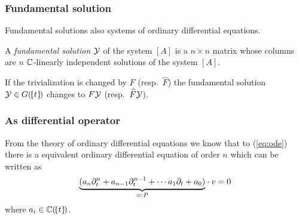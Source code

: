 \subsubsection{Fundamental solution}
\begin{comment}
  See \cite[Sec.4.3.2]{Loday2014}
\end{comment}
Fundamental solutions  also systems of ordinary
differential equations.

\begin{defn}
  A \emph{fundamental solution} $\mathcal{Y}$ of the system $[A]$ is a $n\times n$
  matrix whose columns are $n$ $\mathbb{C}$-linearly independent solutions of the
  system $[A]$.
\end{defn}

\begin{rem}
  If the trivialization is changed by $F$ (resp.\ $\hat F$) the fundamental
  solution $\mathcal{Y}\in G(\!\{t\}\!)$ changes to $F\mathcal{Y}$ (resp.\ $\widehat F\mathcal{Y}$).
\end{rem}

\begin{comment}
  Unique \textbf{up to permutation}?\ or up to basis change?
\end{comment}

\subsubsection{As differential operator}
\begin{comment}
  \begin{itemize}
    \item \cite[Sec.4.2]{Loday2014}
  \end{itemize}
\end{comment}

From the theory of ordinary differential equations we know that to
(\ref{eq:ode}) there is a equivalent ordinary differential equation of order
$n$ which can be written as
\[
  \underset{=:P}{\underbrace{%
      (a_n\partial_t^n+a_{n-1}\partial_t^{n-1}+\cdots a_{1}\partial_t+a_{0})
  }} \cdot v=0
\]
where $a_i\in\mathbb{C}(\!\{t\}\!)$. \TODO{}

\begin{comment}
  See \cite[Sec.1.4]{babbitt1983} for \textbf{ode of rank $n$} to
  \textbf{system}.
\end{comment}

